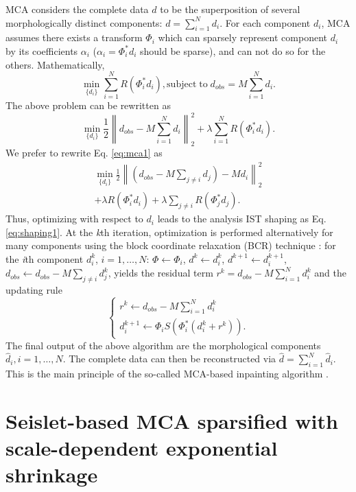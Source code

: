 MCA considers the complete data $d$ to be the superposition of several morphologically distinct components: $d=\sum_{i=1}^Nd_i$. For each component $d_i$, MCA assumes there exists a transform $\Phi_i$ which can sparsely represent component $d_i$ by its coefficients $\alpha_i$ ($\alpha_i=\Phi_i^{*}d_i$ should be sparse), and can not do so for the others. Mathematically,
\begin{equation}\label{eq:mca_un}
  \min_{\{d_i\}}\sum_{i=1}^{N}R(\Phi_i^{*}d_i), \mathrm{subject\; to}\;  d_{obs}=M\sum_{i=1}^{N}d_i.
\end{equation}
The above problem can be rewritten as
\begin{equation}\label{eq:mca1}
  \min_{\{d_i\}}\frac{1}{2}\left\|d_{obs}-M\sum_{i=1}^Nd_i\right\|_2^2+\lambda \sum_{i=1}^NR(\Phi_i^{*}d_i).
\end{equation}
We prefer to rewrite Eq. \eqref{eq:mca1} as
\begin{eqnarray}
  \min_{\{d_i\}}\frac{1}{2}\left\|\left(d_{obs}-M\sum_{j\neq i}d_j\right)-Md_i\right\|_2^2 \nonumber\\
   +\lambda R(\Phi_i^{*}d_i)+\lambda \sum_{j\neq i}R(\Phi_j^{*}d_j).
\end{eqnarray}
Thus, optimizing with respect to $d_i$ leads to the analysis IST shaping as Eq. \eqref{eq:shaping1}. At the \emph{k}th iteration, optimization is performed alternatively for many components using the block coordinate relaxation (BCR) technique \citep{bruce1998block}: for the \emph{i}th component $d_i^{k}$, $i=1,\ldots,N$: $\Phi\leftarrow \Phi_i$, $d^{k}\leftarrow d_i^{k}$, $d^{k+1}\leftarrow d_i^{k+1}$, $d_{obs}\leftarrow d_{obs}-M\sum_{j\neq i}d_j^{k}$, yields the residual term $r^{k}=d_{obs}-M\sum_{i=1}^N d_i^{k}$ and the updating rule
\begin{equation}\label{eq:mca2}
  \left\{
  \begin{array}{l}
    r^{k}\leftarrow d_{obs}-M\sum_{i=1}^N d_i^{k}  \\
    d_i^{k+1}\leftarrow \Phi_i S(\Phi_i^{*}(d_i^{k}+r^{k})).
  \end{array}
  \right.
\end{equation}
The final output of the above algorithm are the morphological components $\hat{d}_i,i=1,\ldots,N$. The complete data can then be reconstructed via $\hat{d}=\sum_{i=1}^N \hat{d}_i$.
This is the main principle of the so-called MCA-based inpainting algorithm \citep{Elad2005}.


\section{Seislet-based MCA sparsified with scale-dependent exponential shrinkage}

